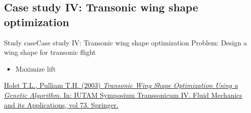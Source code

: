 \documentclass[10pt,compress]{beamer} %
\begin{document}
\subsection{Case study IV: Transonic wing shape optimization}
\begin{frame}{Study case}{Case study IV: Transonic wing shape optimization}
    Problem: Design a wing shape for transonic flight
        \begin{itemize}
        \item Maximize lift
        \end{itemize}

    \setlength{\fboxrule}{0pt}
    \centering {} 
    
    \small
    \begin{flushleft}
    \href{https://link.springer.com/chapter/10.1007/978-94-010-0017-8\_38\#citeas}{Holst T.L., Pulliam T.H. (2003) \textit{Transonic Wing Shape Optimization Using a Genetic Algorithm}. In: IUTAM Symposium Transsonicum IV. Fluid Mechanics and its Applications, vol 73. Springer.}
    \end{flushleft}
\end{frame}
\end{document}
